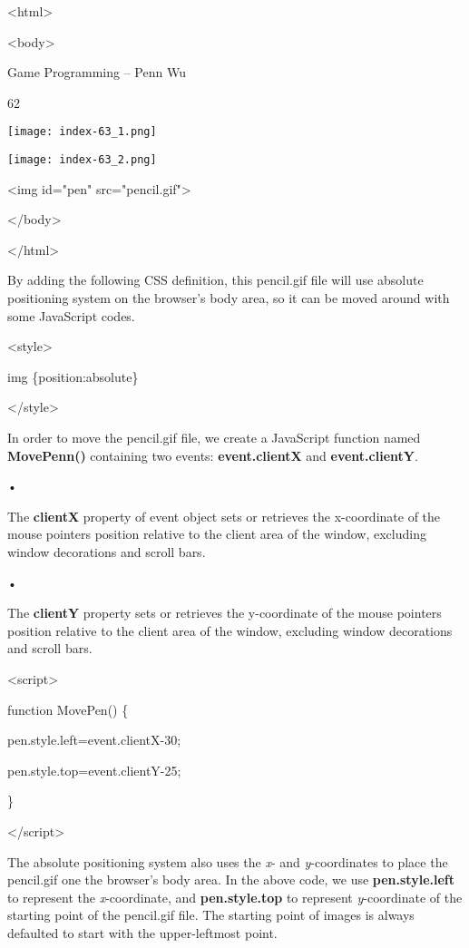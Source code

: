 \documentclass[
]{article}
\begin{document}
\textless html\textgreater{}

\textless body\textgreater{}

Game Programming -- Penn Wu

62

\protect\hypertarget{index_split_005.htmlux5cux23p63}{}{}\texttt{[image: index-63\_1.png]}

\texttt{[image: index-63\_2.png]}

\textless img id="pen" src="pencil.gif"\textgreater{}

\textless/body\textgreater{}

\textless/html\textgreater{}

By adding the following CSS definition, this pencil.gif file will use
absolute positioning system on the browser's body area, so it can be
moved around with some JavaScript codes.

\textless style\textgreater{}

img \{position:absolute\}

\textless/style\textgreater{}

In order to move the pencil.gif file, we create a JavaScript function
named \textbf{MovePenn()} containing two events: \textbf{event.clientX}
and \textbf{event.clientY}.

•

The \textbf{clientX} property of event object sets or retrieves the
x-coordinate of the mouse pointer\textquotesingle s position relative to
the client area of the window, excluding window decorations and scroll
bars.

•

The \textbf{clientY} property sets or retrieves the y-coordinate of the
mouse pointer\textquotesingle s position relative to the client area of
the window, excluding window decorations and scroll bars.

\textless script\textgreater{}

function MovePen() \{

pen.style.left=event.clientX-30;

pen.style.top=event.clientY-25;

\}

\textless/script\textgreater{}

The absolute positioning system also uses the \emph{x}- and
\emph{y}-coordinates to place the pencil.gif one the browser's body
area. In the above code, we use \textbf{pen.style.left} to represent the
\emph{x}-coordinate, and \textbf{pen.style.top} to represent
\emph{y}-coordinate of the starting point of the pencil.gif file. The
starting point of images is always defaulted to start with the
upper-leftmost point.
\end{document}

